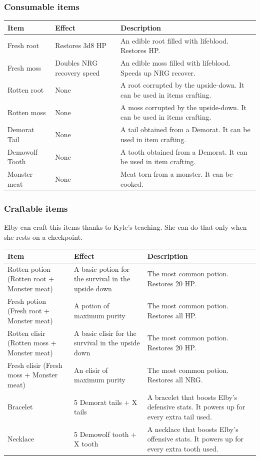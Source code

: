 \subsubsection{Consumable items}
\begin{center}
	\begin{tabular}[c]{| p{4cm} | p{} | p{6cm} |}
		\hline
		Item &  Effect & Description \\
		\hline
		Fresh root & Restores 3d8 HP & An edible root filled with lifeblood. Restores HP.\\
		\hline
		Fresh moss & Doubles NRG recovery speed & An edible moss filled with lifeblood. Speeds up NRG recover.\\
		\hline
		Rotten root &  None & A root corrupted by the upside-down. It can be used in items crafting.\\
		\hline
		Rotten moss &  None & A moss corrupted by the upside-down. It can be used in items crafting.\\
		\hline
		Demorat Tail &  None & A tail obtained from a Demorat. It can be used in item crafting.\\
		\hline
		Demowolf Tooth & None & A tooth obtained from a Demorat. It can be used in item crafting.\\
		\hline
		Monster meat & None & Meat torn from a monster. It can be cooked.\\
		\hline
	\end{tabular}
\end{center}

\subsubsection{Craftable items}
Elby can craft this items thanks to Kyle's teaching. She can do that only when she rests on a checkpoint.

\begin{center}
	\begin{tabular}[c]{| p{4cm} | p{} | p{6cm} |}
		\hline
		Item &  Effect & Description \\
		\hline
		Rotten potion (Rotten root + Monster meat) & A basic potion for the survival in the upside down & The most common potion. Restores 20 HP.\\
		\hline
		Fresh potion (Fresh root + Monster meat) & A potion of maximum purity & The most common potion. Restores all HP.\\
		\hline
		Rotten elisir (Rotten moss + Monster meat) & A basic elisir for the survival in the upside down & The most common potion. Restores 20 HP.\\
		\hline
		Fresh elisir (Fresh moss + Monster meat) & An elisir of maximum purity & The most common potion. Restores all NRG.\\
		\hline
		Bracelet & 5 Demorat tails + X tails & A bracelet that boosts Elby's defensive stats. It powers up for every extra tail used.\\
		\hline
		Necklace & 5 Demowolf tooth + X tooth & A necklace that boosts Elby's offensive stats. It powers up for every extra tooth used.\\
		\hline
	\end{tabular}
\end{center}


